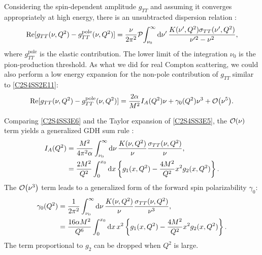 Considering the spin-dependent amplitude $g_{TT}$ and assuming it converges appropriately at high energy, there is an unsubtracted dispersion relation \cite{Drechsel2003}:
\begin{equation} \label{C2S4SS3E5}
\Re[g_{TT}(\nu,Q^2)-g_{TT}^{\mathrm{pole}}(\nu,Q^2)] = \frac{\nu}{2\pi^2}\pv{\int_{\nu_0}^\infty\dd{\nu'}\frac{K(\nu',Q^2)\stt(\nu',Q^2)}{\nu'^2-\nu^2}},
\end{equation}
where $g_{TT}^{\mathrm{pole}}$ is the elastic contribution. The lower limit of the integration $\nu_0$ is the pion-production threshold. As what we did for real Compton scattering, we could also perform a low energy expansion for the non-pole contribution of $g_{TT}$ similar to \cref{C2S4SS2E11}:
\begin{equation} \label{C2S4SS3E6}
\Re[g_{TT}(\nu,Q^2)-g_{TT}^{\mathrm{pole}}(\nu,Q^2)] = \frac{2\alpha}{M^2}I_A(Q^2)\nu+\gamma_0(Q^2)\nu^3+\order{\nu^5}.
\end{equation}

Comparing \cref{C2S4SS3E6} and the Taylor expansion of \cref{C2S4SS3E5}, the $\order{\nu}$ term yields a generalized GDH sum rule \cite{Drechsel2001}:
\begin{equation} \label{C2S4SS3E7}
\begin{split}
I_A(Q^2) & = \frac{M^2}{4\pi^2\alpha}\int_{\nu_0}^\infty\dd{\nu}\frac{K(\nu,Q^2)}{\nu}\frac{\sigma_{TT}(\nu,Q^2)}{\nu}, \\
& = \frac{2M^2}{Q^2}\int_0^{x_0}\dd{x}\left\{g_1(x,Q^2)-\frac{4M^2}{Q^2}x^2g_2(x,Q^2)\right\}.
\end{split}
\end{equation}
The $\order{\nu^3}$ term leads to a generalized form of the forward spin polarizability $\gamma_0$:
\begin{equation} \label{C2S4SS3E8}
\begin{split}
\gamma_0(Q^2) & = \frac{1}{2\pi^2}\int_{\nu_0}^\infty\dd{\nu}\frac{K(\nu,Q^2)}{\nu}\frac{\sigma_{TT}(\nu,Q^2)}{\nu^3}, \\
& = \frac{16\alpha M^2}{Q^6}\int_0^{x_0}\dd{x}x^2\left\{g_1(x,Q^2)-\frac{4M^2}{Q^2}x^2g_2(x,Q^2)\right\}.
\end{split}
\end{equation}
The term proportional to $g_2$ can be dropped when $Q^2$ is large.

